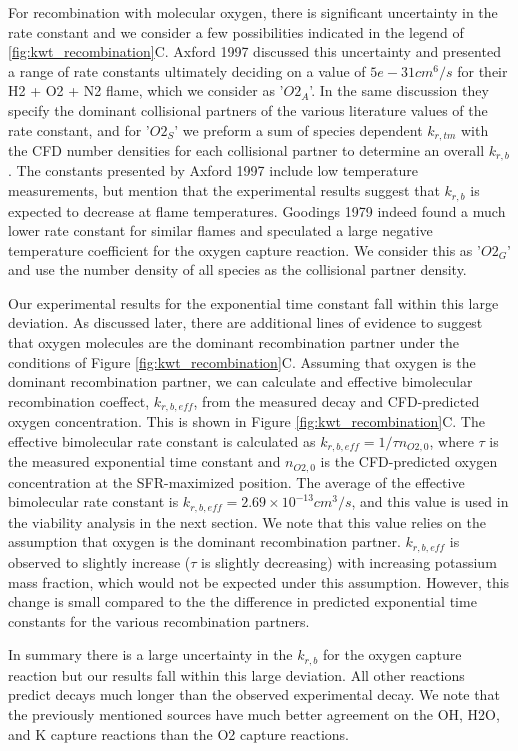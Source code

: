 For recombination with molecular oxygen, there is significant uncertainty in the rate constant and we consider a few possibilities indicated in the legend of \ref{fig:kwt_recombination}C. Axford 1997 discussed this uncertainty and presented a range of rate constants ultimately deciding on a value of $5e-31 cm^6/s$ for their H2 + O2 + N2 flame, which we consider as '$O2_A$'. In the same discussion they specify the dominant collisional partners of the various literature values of the rate constant, and for '$O2_S$' we preform a sum of species dependent $k_{r,tm}$ with the CFD number densities for each collisional partner to determine an overall $k_{r,b}$. The constants presented by Axford 1997 include low temperature measurements, but mention that the experimental results suggest that $k_{r,b}$ is expected to decrease at flame temperatures. Goodings 1979 indeed found a much lower rate constant for similar flames and speculated a large negative temperature coefficient for the oxygen capture reaction. We consider this as '$O2_G$' and use the number density of all species as the collisional partner density.   

Our experimental results for the exponential time constant fall within this large deviation. As discussed later, there are additional lines of evidence to suggest that oxygen molecules are the dominant recombination partner under the conditions of Figure \ref{fig:kwt_recombination}C. Assuming that oxygen is the dominant recombination partner, we can calculate and effective bimolecular recombination coeffect, $k_{r,b,eff}$, from the measured decay and CFD-predicted oxygen concentration. This is shown in Figure \ref{fig:kwt_recombination}C. The effective bimolecular rate constant is calculated as $k_{r,b,eff} = 1/\tau n_{O2,0}$, where $\tau$ is the measured exponential time constant and $n_{O2,0}$ is the CFD-predicted oxygen concentration at the SFR-maximized position. The average of the effective bimolecular rate constant is $k_{r,b,eff} =  2.69 \times 10^{-13} cm^3/s$, and this value is used in the viability analysis in the next section. We note that this value relies on the assumption that oxygen is the dominant recombination partner. $k_{r,b,eff}$ is observed to slightly increase ($\tau$ is slightly decreasing) with increasing potassium mass fraction, which would not be expected under this assumption. However, this change is small compared to the the difference in predicted exponential time constants for the various recombination partners.

In summary there is a large uncertainty in the $k_{r,b}$ for the oxygen capture reaction but our results fall within this large deviation. All other reactions predict decays much longer than the observed experimental decay. We note that the previously mentioned sources have much better agreement on the OH, H2O, and K capture reactions than the O2 capture reactions. 





